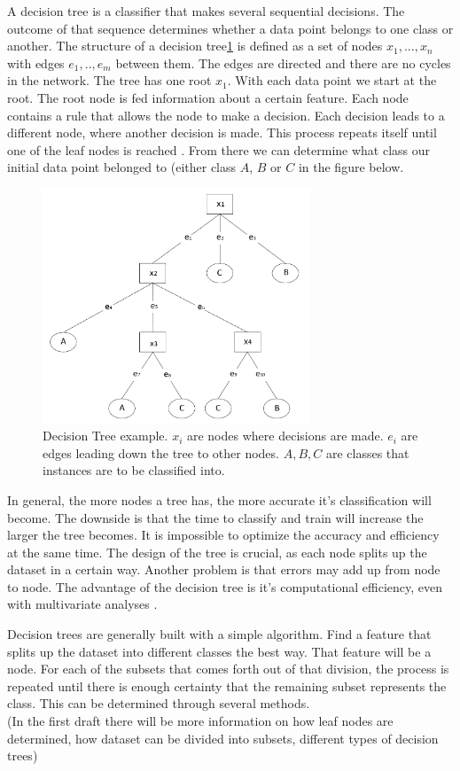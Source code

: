A decision tree is a classifier that makes several sequential decisions. The outcome of that sequence determines whether a data point belongs to one class or another. The structure of a decision tree\ref{fig:DT} is defined as a set of nodes ${x_1, ... , x_n}$ with edges ${e_1, .., e_{m}}$ between them. The edges are directed and there are no cycles in the network. The tree has one root $x_1$. With each data point we start at the root. The root node is fed information about a certain feature. Each node contains a rule that allows the node to make a decision. Each decision leads to a different node, where another decision is made. This process repeats itself until one of the leaf nodes is reached \cite{safavian1991survey}. From there we can determine what class our initial data point belonged to (either class $A$, $B$ or $C$ in the figure below. 
\begin{figure}[H]
    \includegraphics[width=80mm]{./img/decisiontree.png}
    \caption{Decision Tree example. $x_i$ are nodes where decisions are made. $e_i$ are edges leading down the tree to other nodes. $A,B,C$ are classes that instances are to be classified into.}
    \label{fig:DT}
\end{figure}

In general, the more nodes a tree has, the more accurate it's classification will become. The downside is that the time to classify and train will increase the larger the tree becomes. It is impossible to optimize the accuracy and efficiency at the same time. The design of the tree is crucial, as each node splits up the dataset in a certain way. Another problem is that errors may add up from node to node. The advantage of the decision tree is it's computational efficiency, even with multivariate analyses \cite{safavian1991survey}.


Decision trees are generally built with a simple algorithm. Find a feature that splits up the dataset into different classes the best way. That feature will be a node. For each of the subsets that comes forth out of that division, the process is repeated until there is enough certainty that the remaining subset represents the class. This can be determined through several methods. \\

(In the first draft there will be more information on how leaf nodes are determined, how dataset can be divided into subsets, different types of decision trees)
